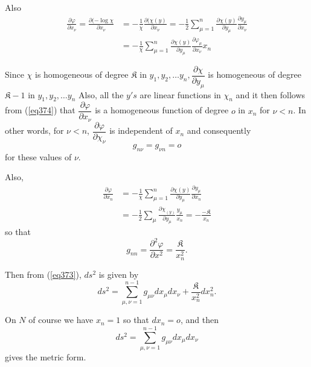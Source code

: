 Also 
\begin{align*}
\frac{\partial \varphi}{\partial x_\nu}  = \frac{\partial (- \log
  \chi}{\partial x_\nu} & = - \frac{1}{\chi} \frac{\partial (\chi
  (y)}{\partial x _\nu} = - \frac{1}{2} \sum^n_{\mu = 1}
\frac{\partial \chi (y)}{\partial y_\mu} \frac{\partial
  y_\mu}{\partial x_\nu}\\ 
& = - \frac{1}{\chi} \sum^n_{\mu = 1} \frac{\partial \chi
  (y)}{\partial y_\mu} \frac{\partial \varphi_\mu}{\partial x_\nu} x_n
\tag{374}\label{eq374}   
\end{align*}

Since $\chi$ is homogeneous of degree $\mathfrak{K}$ in $y_1, y_2,
\ldots y_n, \dfrac{\partial \chi}{\partial y _\mu}$ is homogeneous of
degree $\mathfrak{K} - 1$ in $y_1, y_2, \ldots y_n $ Also, all the
$y's$ are linear functions in $\chi_n$ and it then follows from
(\ref{eq374}) that $\dfrac{\partial \varphi}{\partial x_\nu}$ is a
homogeneous function of degree $o$ in $x_n$ for $\nu < n$. In other
words, for $\nu < n$, $\dfrac {\partial \varphi}{\partial \chi_\nu}$ is
independent of $x_n$ and consequently 
\begin{equation*}
g_{n \nu} = g_{\nu n} = o \tag {375}\label{eq375}  
\end{equation*}
for these values of $\nu$.

Also,\pageoriginale 
\begin{align*}
\frac{\partial \varphi}{\partial x_n} & = - \frac{1}{\chi} \sum^n_{\mu
  = 1} \frac{\partial \chi (y)}{\partial y_\mu} \frac{\partial
  y_\mu}{\partial x_n}\\ 
& = - \frac{1}{2} \sum_{\mu} \frac{\partial \chi_{(y)}}{\partial
  y_\mu} \frac{y_\mu}{x_n} = -\frac{- \mathfrak{K}}{x_n} 
\end{align*}
so that
\begin{equation*}
g_{n n }= \frac{\partial^2 \varphi}{\partial x^2} =
\frac{\mathfrak{K}}{x^2_n}. \tag{376}\label{eq376}   
\end{equation*}

Then from (\ref{eq373}), $d s^2$ is given by
\begin{equation*}
ds^2 = \sum^{n - 1}_{\mu, \nu = 1} g_{\mu \nu} dx _\mu dx _\nu +
\frac{\mathfrak{K}}{x^2_n} d x^2_n. \tag{377}\label{eq377}   
\end{equation*}

On $N$ of course we have $x_n = 1$ so that $ d x_n = o$, and then 
\begin{equation*}
ds^2 = \sum^{n - 1}_{\mu , \nu = 1} g_{\mu \nu} dx_\mu dx_\nu
\tag{378}\label{eq378}    
\end{equation*}
gives the metric form.

